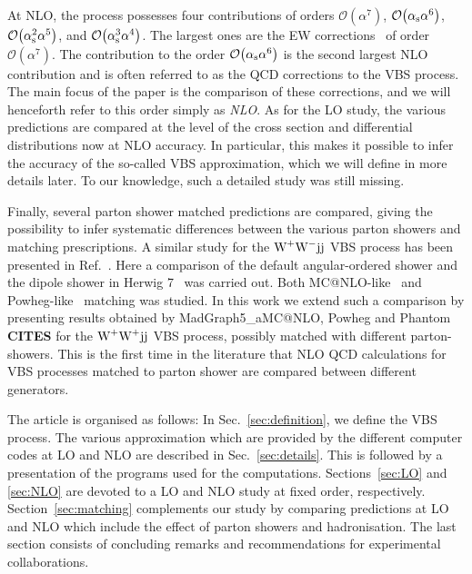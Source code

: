 At NLO, the process possesses four contributions of orders $\mathcal{O}{\left(\alpha^{7}\right)}$, $\mathcal{O}{\left(\alpha_\text{s}\alpha^{6}\right)}$, $\mathcal{O}{\left(\alpha_\text{s}^{2}\alpha^{5}\right)}$, and $\mathcal{O}{\left(\alpha_\text{s}^{3}\alpha^{4}\right)}$.
The largest ones are the EW corrections~\cite{Biedermann:2017bss,Biedermann:2016yds} of order $\mathcal{O}{\left(\alpha^{7}\right)}$.
The contribution to the order $\mathcal{O}{\left(\alpha_\text{s}\alpha^{6}\right)}$ is the second largest NLO contribution and is often referred to as the QCD corrections to the VBS process.
The main focus of the paper is the comparison of these corrections, and we will henceforth refer to this order simply as \emph{NLO}.
As for the LO study, the various predictions are compared at the level of the cross section and differential distributions now at NLO accuracy.
In particular, this makes it possible to infer the accuracy of the so-called VBS approximation, which we will define in more details later.
To our knowledge, such a detailed study was still missing. 

Finally, several parton shower matched predictions are compared, giving the possibility to infer systematic differences between the various parton showers and matching prescriptions.
A similar study for the $\text{W}^+ \text{W}^- \text{j} \text{j}$ VBS process has been presented in
Ref.~\cite{Rauch:2016upa}. Here a comparison of the default angular-ordered shower and the dipole
shower  in {\sc Herwig 7}~\cite{Bellm:2015jjp} was carried out. Both {\sc MC@NLO}-like~\cite{Frixione:2002ik} and {\sc Powheg}-like~\cite{Nason:2004rx,Frixione:2007vw} matching was studied. In this work we extend such a comparison by presenting 
results obtained by {\sc MadGraph5\_aMC@NLO}, {\sc Powheg} and {\sc Phantom} {\bf CITES} for the $\text{W}^+ \text{W}^+ \text{j} \text{j}$ VBS process, possibly matched with different parton-showers.
This is the first time in the literature that NLO QCD calculations for VBS processes matched to parton shower are compared between different generators. 

The article is organised as follows:
In Sec.~\ref{sec:definition}, we define the VBS process.
The various approximation which are provided by the different computer codes at LO and NLO are described in Sec.~\ref{sec:details}.
This is followed by a presentation of the programs used for the computations.
Sections~\ref{sec:LO} and \ref{sec:NLO} are devoted to a LO and NLO study at fixed order, respectively.
Section~\ref{sec:matching} complements our study by comparing predictions at LO and NLO which include the effect of parton showers and hadronisation.
The last section consists of concluding remarks and recommendations for experimental collaborations.
